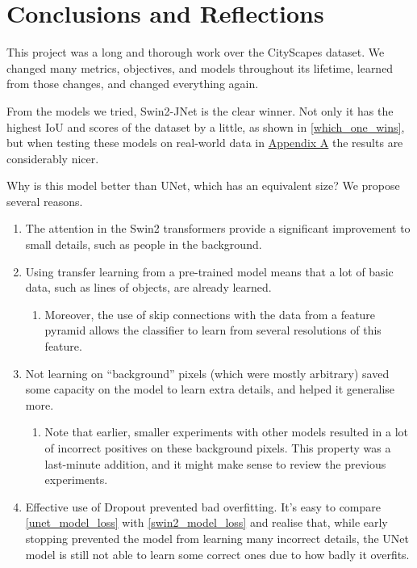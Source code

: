 \section{Conclusions and Reflections}

This project was a long and thorough work over the CityScapes dataset.
We changed many metrics, objectives, and models throughout its lifetime, learned from those changes, and changed everything again.

From the models we tried, Swin2-JNet is the clear winner.
Not only it has the highest IoU and \iiouc{} scores of the dataset by a little, as shown in \cref{which_one_wins}, but when testing these models on real-world data in \hyperref[hackneyscapes]{Appendix A} the results are considerably nicer.

Why is this model better than UNet, which has an equivalent size?
We propose several reasons.
\begin{enumerate}[topsep=0pt]
	\item The attention in the Swin2 transformers provide a significant improvement to small details, such as people in the background.
	\item Using transfer learning from a pre-trained model means that a lot of basic data, such as lines of objects, are already learned.
		\begin{enumerate}
			\item Moreover, the use of skip connections with the data from a feature pyramid allows the classifier to learn from several resolutions of this feature.
		\end{enumerate}
	\item Not learning on ``background'' pixels (which were mostly arbitrary) saved some capacity on the model to learn extra details, and helped it generalise more.
		\begin{enumerate}
			\item Note that earlier, smaller experiments with other models resulted in a lot of incorrect positives on these background pixels.
				This property was a last-minute addition, and it might make sense to review the previous experiments.
		\end{enumerate}
	\item Effective use of Dropout prevented bad overfitting.
		It's easy to compare \cref{unet_model_loss} with \cref{swin2_model_loss} and realise that, while early stopping prevented the model from learning many incorrect details, the UNet model is still not able to learn some correct ones due to how badly it overfits.
\end{enumerate}

